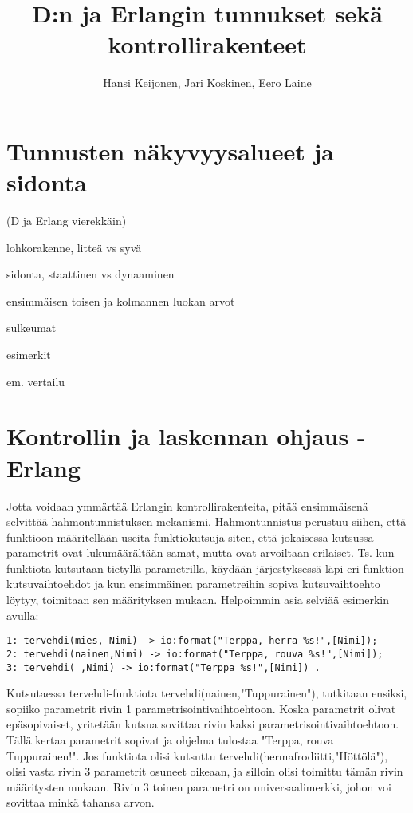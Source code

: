 \documentclass[11pt,oneside,a4paper]{article}
\title{D:n ja Erlangin tunnukset sekä kontrollirakenteet}
\author{Hansi Keijonen, Jari Koskinen, Eero Laine}
\begin{document}
\maketitle



\section{Tunnusten näkyvyysalueet ja sidonta}
(D ja Erlang vierekkäin)

lohkorakenne, litteä vs syvä

sidonta, staattinen vs dynaaminen

ensimmäisen toisen ja kolmannen luokan arvot

sulkeumat

esimerkit

em. vertailu

\section{Kontrollin ja laskennan ohjaus - Erlang}
Jotta voidaan ymmärtää Erlangin kontrollirakenteita, pitää ensimmäisenä selvittää hahmontunnistuksen mekanismi. Hahmontunnistus perustuu siihen, että
funktioon määritellään useita funktiokutsuja siten, että jokaisessa kutsussa parametrit ovat lukumäärältään samat, mutta ovat arvoiltaan erilaiset. Ts. kun 
funktiota kutsutaan tietyllä parametrilla, käydään järjestyksessä läpi eri funktion kutsuvaihtoehdot ja kun ensimmäinen parametreihin sopiva kutsuvaihtoehto löytyy, 
toimitaan sen määrityksen mukaan. Helpoimmin asia selviää esimerkin avulla: 
\begin{verbatim}
1: tervehdi(mies, Nimi) -> io:format("Terppa, herra %s!",[Nimi]);
2: tervehdi(nainen,Nimi) -> io:format("Terppa, rouva %s!",[Nimi]);
3: tervehdi(_,Nimi) -> io:format("Terppa %s!",[Nimi]) . 
\end{verbatim}


Kutsutaessa tervehdi-funktiota tervehdi(nainen,"Tuppurainen"), tutkitaan ensiksi, sopiiko parametrit  rivin 1 parametrisointivaihtoehtoon. Koska parametrit olivat epäsopivaiset, 
yritetään kutsua sovittaa rivin kaksi parametrisointivaihtoehtoon. Tällä kertaa parametrit sopivat ja ohjelma tulostaa "Terppa, rouva Tuppurainen!". Jos funktiota olisi kutsuttu
tervehdi(hermafrodiitti,"Höttölä"), olisi vasta rivin 3 parametrit osuneet oikeaan, ja silloin olisi toimittu tämän rivin määritysten mukaan. 
Rivin 3 toinen parametri on universaalimerkki, 
johon voi sovittaa minkä tahansa arvon.
\end{document}
